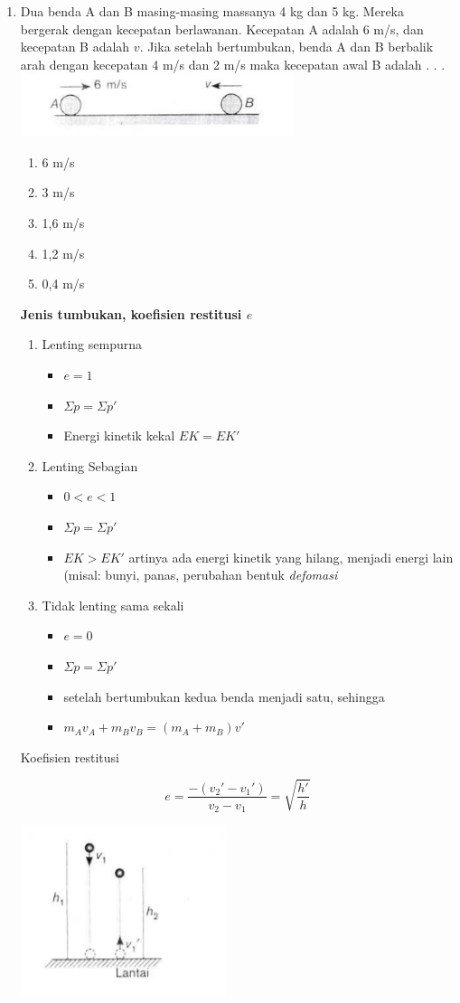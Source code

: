 \documentclass[11pt,a4paper]{extarticle}
\newcommand*\daftar[1]{
\begin{itemize}[label=$\bullet$, itemsep=0pt,topsep=0pt,leftmargin=*] #1 
\end{itemize}}
\newcommand{\pilgani}[1]{                            \vspace{-0.3cm}\begin{multicols}{2}
 \begin{enumerate}[label=\Alph*., itemsep=0pt,topsep=0pt,leftmargin=*,align=Center]#1                     \end{enumerate}
 \phantom{ini cuma sapi, wedus, dan ayam}
 \end{multicols}}
\begin{document}
\begin{multicols*}{2}
\begin{enumerate}
\item Dua benda A dan B masing-masing massanya 4 kg dan 5 kg. Mereka bergerak dengan kecepatan berlawanan. Kecepatan A adalah 6 m/s, dan kecepatan B adalah $v$. Jika setelah bertumbukan, benda A dan B berbalik arah dengan kecepatan 4 m/s dan 2 m/s maka kecepatan awal B adalah . . . 
\includegraphics[width=8cm]{pic/mom1}
\pilgani{
        \item 6 m/s
        \item 3 m/s
        \item 1,6 m/s
        \item 1,2 m/s
        \item 0,4 m/s
        }
\vspace{2cm}
\textbf{Jenis tumbukan, koefisien restitusi $e$}
        \begin{enumerate}
\item Lenting sempurna
     \daftar{
        \item $e =1 $
        \item $\Sigma p = \Sigma p' $
        \item Energi kinetik kekal $EK=EK'$
        }

 \item Lenting Sebagian
        \daftar{
        \item $0<e<1$
        \item $\Sigma p = \Sigma p'$
        \item $EK> EK'$ artinya ada energi kinetik yang hilang, menjadi energi lain (misal: bunyi, panas, perubahan bentuk \textit{defomasi}}

 \item Tidak lenting sama sekali
        \daftar{
        \item $e=0$
        \item $\Sigma p = \Sigma p'$
        \item setelah bertumbukan kedua benda menjadi satu, sehingga 
        \item $m_Av_A + m_Bv_B = (m_A + m_B)v'$
        }
        \end{enumerate}

Koefisien restitusi

$$ e = \frac{-(v_2'-v_1')}{v_2-v_1} = \sqrt{\frac{h'}{h}} $$

\includegraphics[height=5cm]{pic/mom2}


\end{enumerate}
\end{multicols*}
\end{document}
